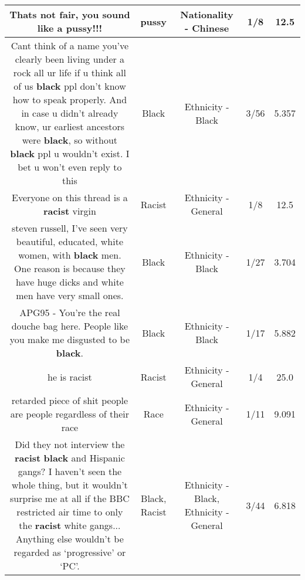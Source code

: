 \documentclass[11pt]{article}
\newlength\mylength
\begin{document}
\begin{center}
\begin{longtable}{|C{.65\mylength}|C{.30\mylength}|C{.12\mylength}|C{.12\mylength}|C{.12\mylength}|}
  \small Thats not fair, you sound like a \textbf{pussy}!!!\normalsize   & pussy & Nationality - Chinese & 1/8 & 12.5 \\  \hline
  \small Cant think of a name you've clearly been living under a rock all ur life if u think all of us \textbf{black} ppl don't know how to speak properly. And in case u didn't already know, ur earliest ancestors were \textbf{black}, so without \textbf{black} ppl u wouldn't exist. I bet u won't even reply to this\normalsize   & Black & Ethnicity - Black & 3/56 & 5.357 \\  \hline
  \small Everyone on this thread is a \textbf{racist} virgin\normalsize   & Racist & Ethnicity - General & 1/8 & 12.5 \\  \hline
  \small steven russell, I've seen very beautiful, educated, white women, with \textbf{black} men. One reason is because they have huge dicks and white men have very small ones.\normalsize   & Black & Ethnicity - Black & 1/27 & 3.704 \\  \hline
  \small APG95 - You're the real douche bag here. People like you make me disgusted to be \textbf{black}.\normalsize   & Black & Ethnicity - Black & 1/17 & 5.882 \\  \hline
  \small {} he is racist\normalsize   & Racist & Ethnicity - General & 1/4 & 25.0 \\  \hline
  \small retarded piece of shit people are people regardless of their race\normalsize   & Race & Ethnicity - General & 1/11 & 9.091 \\  \hline
  \small Did they not interview the \textbf{racist} \textbf{black} and Hispanic gangs? I haven't seen the whole thing, but it wouldn't surprise me at all if the BBC restricted air time to only the \textbf{racist} white gangs... Anything else wouldn't be regarded as ‘progressive' or ‘PC'.\normalsize   & Black, Racist & Ethnicity - Black, Ethnicity - General & 3/44 & 6.818 \\  \hline

\end{longtable}
\end{center}
\end{document}
